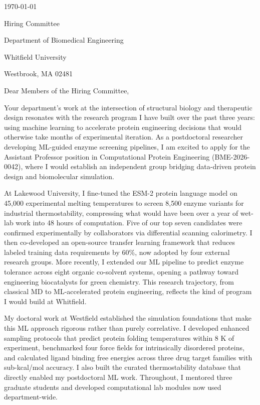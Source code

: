 \documentclass{cv} %
\begin{document}
{\color{notiongray}\today}

\vspace{0.6em}
{\setlength{\parskip}{0pt}
Hiring Committee\par
Department of Biomedical Engineering\par
Whitfield University\par
Westbrook, MA 02481\par}

\vspace{0.8em}
Dear Members of the Hiring Committee,

\setlength{\parskip}{0.75em}
Your department's work at the intersection of structural biology and therapeutic design resonates with the research program I have built over the past three years: using machine learning to accelerate protein engineering decisions that would otherwise take months of experimental iteration. As a postdoctoral researcher developing ML-guided enzyme screening pipelines, I am excited to apply for the Assistant Professor position in Computational Protein Engineering (BME-2026-0042), where I would establish an independent group bridging data-driven protein design and biomolecular simulation.

At Lakewood University, I fine-tuned the ESM-2 protein language model on 45,000 experimental melting temperatures to screen 8,500 enzyme variants for industrial thermostability, compressing what would have been over a year of wet-lab work into 48 hours of computation. Five of our top seven candidates were confirmed experimentally by collaborators via differential scanning calorimetry. I then co-developed an open-source transfer learning framework that reduces labeled training data requirements by 60\%, now adopted by four external research groups. More recently, I extended our ML pipeline to predict enzyme tolerance across eight organic co-solvent systems, opening a pathway toward engineering biocatalysts for green chemistry. This research trajectory, from classical MD to ML-accelerated protein engineering, reflects the kind of program I would build at Whitfield.

My doctoral work at Westfield established the simulation foundations that make this ML approach rigorous rather than purely correlative. I developed enhanced sampling protocols that predict protein folding temperatures within 8 K of experiment, benchmarked four force fields for intrinsically disordered proteins, and calculated ligand binding free energies across three drug target families with sub-kcal/mol accuracy. I also built the curated thermostability database that directly enabled my postdoctoral ML work. Throughout, I mentored three graduate students and developed computational lab modules now used department-wide.
\end{document}
